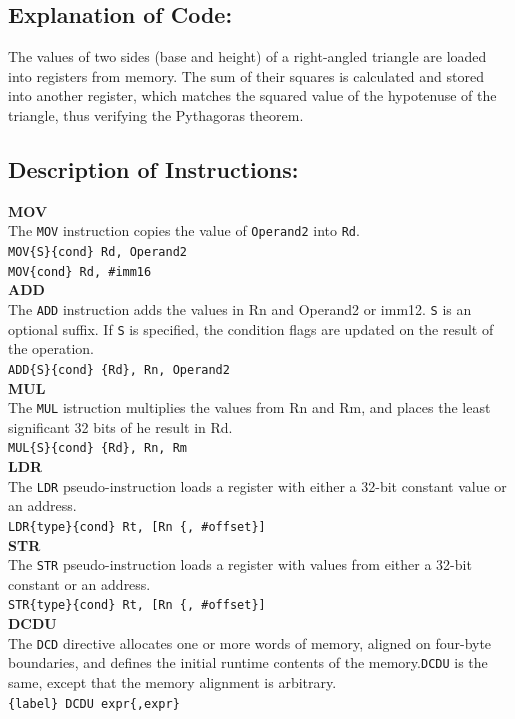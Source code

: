 \documentclass[12pt]{article}
\begin{document}
\subsection{Explanation of Code:}
The values of two sides (base and height) of a right-angled triangle are loaded into registers from memory. The sum of their squares is calculated and stored into another register, which matches the squared value of the hypotenuse of the triangle, thus verifying the Pythagoras theorem.\\
\subsection{Description of Instructions:}
\textbf{MOV}\\The \verb|MOV| instruction copies the value of \verb|Operand2| into \verb|Rd|.\\
\verb|MOV{S}{cond} Rd, Operand2|\\
\verb|MOV{cond} Rd, #imm16|\\
\textbf{ADD}\\
The \verb|ADD| instruction adds the values in Rn and Operand2 or imm12. \verb|S| is an optional suffix. If \verb|S| is specified, the condition flags are updated on the result of the operation.\\
\verb|ADD{S}{cond} {Rd}, Rn, Operand2|\\
\textbf{MUL}\\
The \verb|MUL| istruction multiplies the values from Rn and Rm, and places the least significant 32 bits of he result in Rd.\\
\verb |MUL{S}{cond} {Rd}, Rn, Rm|\\
\textbf{LDR}\\
The \verb|LDR| pseudo-instruction loads a register with either a 32-bit constant value or an address.\\
\verb|LDR{type}{cond} Rt, [Rn {, #offset}]| \\
\textbf{STR}\\
The \verb|STR| pseudo-instruction loads a register with values from either a 32-bit constant or an address.\\
\verb|STR{type}{cond} Rt, [Rn {, #offset}]|\\  
\textbf{DCDU}\\
The \verb|DCD| directive allocates one or more words of memory, aligned on four-byte boundaries, and defines the initial runtime contents of the memory.\verb|DCDU| is the same, except that the memory alignment is arbitrary.\\
\verb|{label} DCDU expr{,expr}|\\
 \pagebreak
\end{document}
